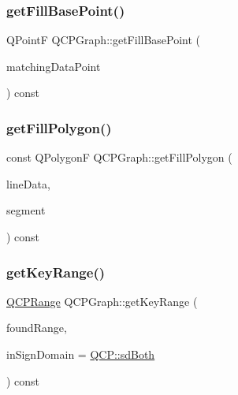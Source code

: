 \subsubsection{\texorpdfstring{get\+Fill\+Base\+Point()}{getFillBasePoint()}}
{\footnotesize\ttfamily Q\+PointF Q\+C\+P\+Graph\+::get\+Fill\+Base\+Point (\begin{DoxyParamCaption}\item[{Q\+PointF}]{matching\+Data\+Point }\end{DoxyParamCaption}) const\hspace{0.3cm}{\ttfamily [protected]}}

\mbox{\label{class_q_c_p_graph_af73d5fe97cde966785bfd67201e44391}} 
\subsubsection{\texorpdfstring{get\+Fill\+Polygon()}{getFillPolygon()}}
{\footnotesize\ttfamily const Q\+PolygonF Q\+C\+P\+Graph\+::get\+Fill\+Polygon (\begin{DoxyParamCaption}\item[{const Q\+Vector$<$ Q\+PointF $>$ $\ast$}]{line\+Data,  }\item[{\hyperlink{class_q_c_p_data_range}{Q\+C\+P\+Data\+Range}}]{segment }\end{DoxyParamCaption}) const\hspace{0.3cm}{\ttfamily [protected]}}

\mbox{\label{class_q_c_p_graph_aac47c6189e3aea46ea46939e5d14796c}} 
\subsubsection{\texorpdfstring{get\+Key\+Range()}{getKeyRange()}}
{\footnotesize\ttfamily \hyperlink{class_q_c_p_range}{Q\+C\+P\+Range} Q\+C\+P\+Graph\+::get\+Key\+Range (\begin{DoxyParamCaption}\item[{bool \&}]{found\+Range,  }\item[{\hyperlink{namespace_q_c_p_afd50e7cf431af385614987d8553ff8a9}{Q\+C\+P\+::\+Sign\+Domain}}]{in\+Sign\+Domain = {\ttfamily \hyperlink{namespace_q_c_p_afd50e7cf431af385614987d8553ff8a9aa38352ef02d51ddfa4399d9551566e24}{Q\+C\+P\+::sd\+Both}} }\end{DoxyParamCaption}) const\hspace{0.3cm}{\ttfamily [virtual]}}

